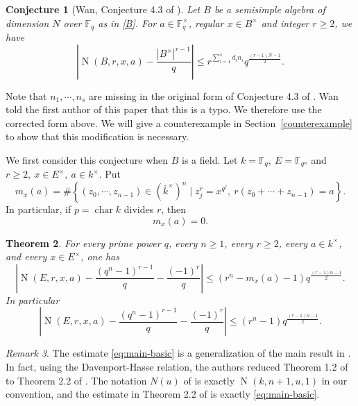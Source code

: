 \documentclass[11pt]{amsart}
\newtheorem{theorem}{Theorem}[section]
\newtheorem{conjecture}[theorem]{Conjecture}
\theoremstyle{remark}
\newtheorem{remark}[theorem]{Remark}
\newcommand{\F}{\mathbb F}
\newcommand{\Nm}{\operatorname{N}}
\begin{document}
\begin{conjecture}[Wan, Conjecture 4.3 of \cite{WanNormTrace} ]\label{conj2} Let $B$ be a semisimple algebra of dimension $N$ over $\F_q$ as in \eqref{B}. For $a\in \F_q^{\times}$,
regular $x \in B^{\times}$ and integer $r\ge 2$, we have
\[
\left|\Nm(B,r,x,a) - \frac{|B^{\times}|^{r-1}}{q}\right| \le r^{\sum_{i=1}^s d_i n_i} q^{\frac{(r-1)N-1}{2}}.
\]
\end{conjecture}

Note that $n_1, \cdots, n_s$ are missing in the original form of Conjecture 4.3 of \cite{WanNormTrace}. Wan told the first author of this paper that this is a typo. We therefore use the corrected form above. We will give a counterexample in Section~\ref{counterexample} to show that this modification is necessary.

We first consider this conjecture when $B$ is a field. 
Let $k=\F_q,~E=\F_{q^n}$
and $r\ge 2,~x\in E^{\times},~a\in k^{\times}$. Put
\begin{equation}\label{eq:mxa-def}
        m_x(a)=\#\left\{(z_0,\cdots,z_{n-1})\in(\bar{k}^{\times})^n\mid
        z_{j}^r=x^{q^j},~r(z_0+\cdots+z_{n-1})=a\right\}.
\end{equation}
In particular, if $p=\operatorname{char}k$
divides $r$, then
\begin{equation}\label{eq:m-zero-p-divides-r}
        m_x(a)=0.
\end{equation}

\begin{theorem}\label{main thm}
For every prime power $q$, every $n\ge 1$, every $r\ge 2$, every
$a\in k^{\times}$, and every $x\in E^\times$, one has
\begin{equation}\label{eq:main}
\left|\Nm(E,r,x,a)-\frac{(q^n-1)^{r-1}}{q}-\frac{(-1)^r}{q}\right|\le(r^n-m_x(a)-1)q^{\frac{(r-1)n-1}{2}}.
\end{equation}
In particular
\begin{equation}\label{eq:main-basic}
\left|\Nm(E,r,x,a)-\frac{(q^n-1)^{r-1}}{q}-\frac{(-1)^r}{q}\right|\le (r^n-1) q^{\frac{(r-1)n-1}{2}}.
\end{equation}
\end{theorem}

\begin{remark}
The estimate \eqref{eq:main-basic} is a generalization of the main result in \cite{MoisioWan}. In fact, using the Davenport-Hasse relation, the authors reduced Theorem 1.2 of \cite{MoisioWan} to Theorem 2.2 of \cite{MoisioWan}. The notation $N(u)$ of \cite{MoisioWan} is exactly $\Nm(k,n+1,u,1)$ in our convention, and the estimate in Theorem 2.2 of \cite{MoisioWan} is exactly \eqref{eq:main-basic}.
\end{remark}
\end{document}
